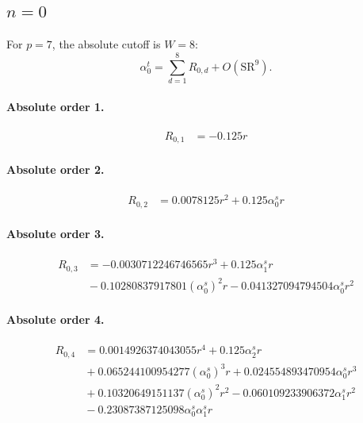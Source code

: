 \documentclass[10pt]{article}
\begin{document}
\subsection{$n=0$}
For $p=7$, the absolute cutoff is $W=8$:
\[\alpha_{0}^t=\sum_{d=1}^{8}R_{0,d}+O(\mathrm{SR}^{9}).\]
\paragraph{Absolute order 1.}
\begin{align*}
R_{0,1} &=  - 0.125 r
\end{align*}

\paragraph{Absolute order 2.}
\begin{align*}
R_{0,2} &= 0.0078125 r^{2} + 0.125 \alpha_{0}^s r
\end{align*}

\paragraph{Absolute order 3.}
\begin{align*}
R_{0,3} &=  - 0.0030712246746565 r^{3} + 0.125 \alpha_{1}^s r \\
&{}  - 0.10280837917801 \left(\alpha_{0}^s\right)^{2} r - 0.041327094794504 \alpha_{0}^s r^{2}
\end{align*}

\paragraph{Absolute order 4.}
\begin{align*}
R_{0,4} &= 0.0014926374043055 r^{4} + 0.125 \alpha_{2}^s r \\
&{}  + 0.065244100954277 \left(\alpha_{0}^s\right)^{3} r + 0.024554893470954 \alpha_{0}^s r^{3} \\
&{}  + 0.10320649151137 \left(\alpha_{0}^s\right)^{2} r^{2} - 0.060109233906372 \alpha_{1}^s r^{2} \\
&{}  - 0.23087387125098 \alpha_{0}^s \alpha_{1}^s r
\end{align*}
\end{document}
